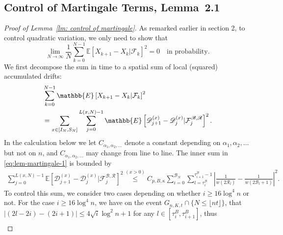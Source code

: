 \documentclass[EJP]{ejpecp} %
\begin{document}
\subsection{Control of Martingale Terms, Lemma~2.1} 
\begin{proof}[Proof of Lemma~\ref{lm: control of martingale}]
	As remarked earlier in section 2, to control quadratic variation, we only need to show that
	\[
	\lim_{N \to \infty } \frac{1}{N} \sum_{k = 0}^{N-1} \mathbb{E}\left[ X_{k+1} - X_k | \mathcal{F}_k \right]^2 = 0
	\quad \text{in probability}
	.\] 
	We first decompose the sum in time to a spatial sum of local (squared) accumulated drifts:
	\begin{align}
		&\sum_{k = 0}^{N-1} \mathbb{E}\left[ X_{k+1} - X_k | \mathcal{F}_k \right]^2
		\notag
		\\
		&= \sum_{x \in \left[ I_N, S_N \right]} \sum_{j = 0}^{L(x, N) - 1} \mathbb{E}\left[ \mathscr{D}_{j+1}^{(x)} - \mathscr{D}_j^{(x)} | \mathcal{F}_{j}^{\mathscr{B}, \mathscr{R}} \right]^2  
		\label{eq:lem-martingale-1}
		.\end{align}
	In the calculation below we let $C_{\alpha_1, \alpha_2, \dots}$ denote a constant depending on  $\alpha_1, \alpha_2, \dots$ but not on $n$, and $C_{\alpha_1, \alpha_2, \dots}$ may change from line to line.
	The inner sum in \eqref{eq:lem-martingale-1} is bounded by
	\begin{align*}
		\sum_{j =0}^{ L(x, N) - 1} \mathbb{E}\left[ \mathscr{D}_{j+1}^{(x)} - \mathscr{D}_j^{(x)} | \mathcal{F}_{j}^{\mathscr{B}, \mathscr{R}} \right]^2 \stackrel{(x > 0)}{\le} C_{p, B, \kappa} \sum_{i = 0}^{\mathscr{B}_N} \sum_{l = \tau_i^{\mathscr{B}}}^{\tau_{i+1}^{\mathscr{B}}-1}
		\left| \frac{1}{w(2 \mathscr{R}_l)} - \frac{1}{w\left( 2 \mathscr{B}_l + 1 \right) } \right|^2 
		.
	\end{align*}
	To control this sum, we consider two cases depending on whether $i \ge 16 \log^4 n$ or not. For the case $i \ge 16 \log^4 n$, we have on the event $G_{n, K, t}\cap \{N \le \lfloor nt \rfloor\}$, that $|(2 l - 2 i) - (2 i + 1)| \leq 4 \sqrt{i} \log^2 n + 1$ for any $l \in [\tau_i^B, \tau_{i+1}^B]$, thus
	\begin{align*}

\end{align*}
\end{proof}
\end{document}
